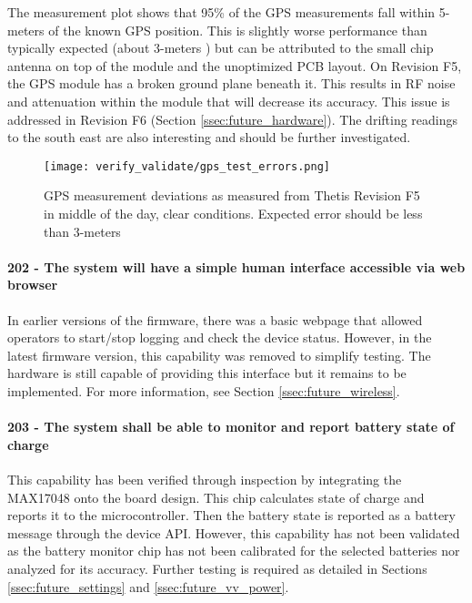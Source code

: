 The measurement plot shows that 95\% of the GPS measurements fall within 5-meters of the known GPS position.
This is slightly worse performance than typically expected (about 3-meters \cite{Hofmann:2001}) but can be attributed to the small chip antenna on top of the module and the unoptimized PCB layout.
On Revision F5, the GPS module has a broken ground plane beneath it.
This results in RF noise and attenuation within the module that will decrease its accuracy.
This issue is addressed in Revision F6 (Section \ref{ssec:future_hardware}).
The drifting readings to the south east are also interesting and should be further investigated.

\begin{figure}[h!]
    \caption[GPS measurement deviations]{GPS measurement deviations as measured from Thetis Revision F5 in middle of the day, clear conditions.
	Expected error should be less than 3-meters}
    \centering
    \texttt{[image: verify\_validate/gps\_test\_errors.png]}
\end{figure}

\paragraph*{202 - The system will have a simple human interface accessible via web browser} In earlier versions of the firmware, there was a basic webpage that allowed operators to start/stop logging and check the device status.
However, in the latest firmware version, this capability was removed to simplify testing.
The hardware is still capable of providing this interface but it remains to be implemented.
For more information, see Section \ref{ssec:future_wireless}.

\paragraph*{203 - The system shall be able to monitor and report battery state of charge} This capability has been verified through inspection by integrating the MAX17048 onto the board design.
This chip calculates state of charge and reports it to the microcontroller.
Then the battery state is reported as a battery message through the device API.
However, this capability has not been validated as the battery monitor chip has not been calibrated for the selected batteries nor analyzed for its accuracy.
Further testing is required as detailed in Sections \ref{ssec:future_settings} and \ref{ssec:future_vv_power}.

